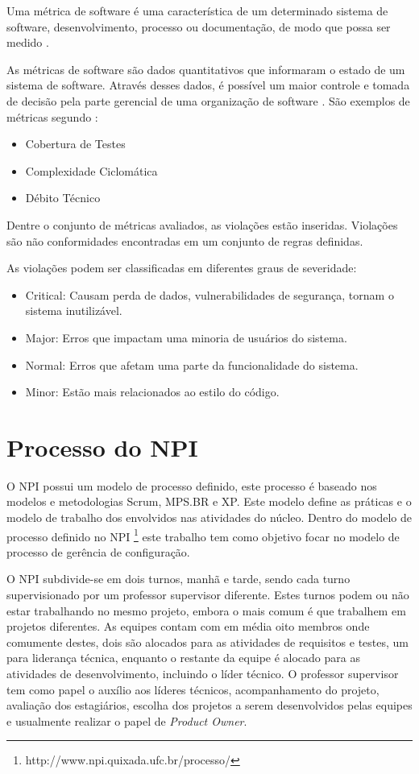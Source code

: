 Uma métrica de software é uma característica de um determinado sistema de software, desenvolvimento, processo ou documentação, de modo que possa ser medido \cite{sommerville2011}.

As métricas de software são dados quantitativos que informaram o estado de um sistema de software. Através desses dados, é possível um maior controle e tomada de decisão pela parte gerencial de uma organização de software \cite{karina2008}. São exemplos de métricas segundo :
\begin{itemize}
\item{Cobertura de Testes}
\item{Complexidade Ciclomática}
\item{Débito Técnico}
\end{itemize}	

Dentre o conjunto de métricas avaliados, as violações estão inseridas. Violações são não conformidades encontradas em um conjunto de regras definidas.

As violações podem ser classificadas em diferentes graus de severidade:

\begin{itemize}
\item{Critical:} Causam perda de dados, vulnerabilidades de segurança, tornam o sistema inutilizável.
\item{Major: Erros que impactam uma minoria de usuários do sistema.}
\item{Normal: Erros que afetam uma parte da funcionalidade do sistema.}
\item{Minor: Estão mais relacionados ao estilo do código.}
\end{itemize}	


\section{Processo do NPI}\label{processonpi}
O NPI possui um modelo de processo definido, este processo é baseado nos modelos e metodologias Scrum, MPS.BR e XP. Este modelo define as práticas e o modelo de trabalho dos envolvidos nas atividades do núcleo. Dentro do modelo de processo definido no NPI \footnote{http://www.npi.quixada.ufc.br/processo/} este trabalho tem como objetivo focar no modelo de processo de gerência de configuração.

O NPI subdivide-se em dois turnos, manhã e tarde, sendo cada turno supervisionado por um professor supervisor diferente. Estes turnos podem ou não estar trabalhando no mesmo projeto, embora o mais comum é que trabalhem em projetos diferentes. As equipes contam com em média oito membros onde comumente destes, dois são alocados para as atividades de requisitos e testes, um para liderança técnica, enquanto o restante da equipe é alocado para as atividades de desenvolvimento, incluindo o líder técnico. O professor supervisor tem como papel o auxílio aos líderes técnicos, acompanhamento do projeto, avaliação dos estagiários, escolha dos projetos a serem desenvolvidos pelas equipes e usualmente realizar o papel de \textit{Product Owner}. 

